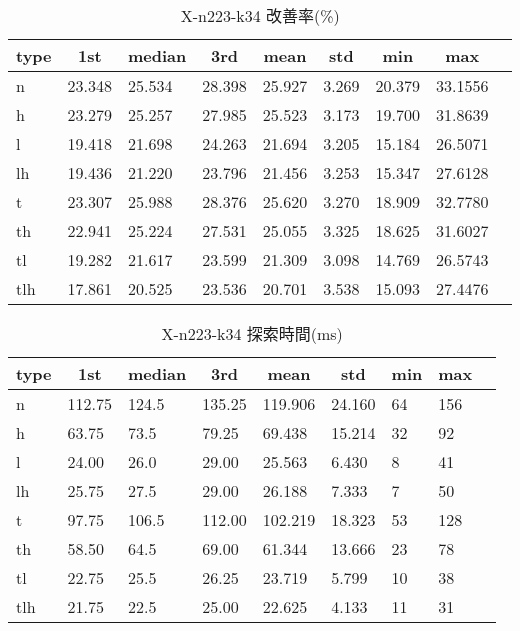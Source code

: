 \begin{table}[htbp]
    \caption{X-n223-k34 改善率(\%)}
    \begin{tabular}{|l|l|l|l|l|l|l|l|l|}\hline
    \multicolumn{1}{|c|}{\textbf{type}}
    &\multicolumn{1}{|c|}{\textbf{1st}}
    &\multicolumn{1}{c|}{\textbf{median}}
    &\multicolumn{1}{c|}{\textbf{3rd}}
    &\multicolumn{1}{c|}{\textbf{mean}}
    &\multicolumn{1}{c|}{\textbf{std}}
    &\multicolumn{1}{c|}{\textbf{min}}
    &\multicolumn{1}{c|}{\textbf{max}}\\\hline
	n & 23.348 & 25.534 & 28.398 & 25.927 & 3.269 & 20.379 & 33.1556\\\hline
	h & 23.279 & 25.257 & 27.985 & 25.523 & 3.173 & 19.700 & 31.8639\\\hline
	l & 19.418 & 21.698 & 24.263 & 21.694 & 3.205 & 15.184 & 26.5071\\\hline
	lh & 19.436 & 21.220 & 23.796 & 21.456 & 3.253 & 15.347 & 27.6128\\\hline
	t & 23.307 & 25.988 & 28.376 & 25.620 & 3.270 & 18.909 & 32.7780\\\hline
	th & 22.941 & 25.224 & 27.531 & 25.055 & 3.325 & 18.625 & 31.6027\\\hline
	tl & 19.282 & 21.617 & 23.599 & 21.309 & 3.098 & 14.769 & 26.5743\\\hline
	tlh & 17.861 & 20.525 & 23.536 & 20.701 & 3.538 & 15.093 & 27.4476\\\hline
	\end{tabular}
\end{table}
\begin{table}[htbp]
    \caption{X-n223-k34 探索時間(ms)}
    \begin{tabular}{|l|l|l|l|l|l|l|l|l|}\hline
    \multicolumn{1}{|c|}{\textbf{type}}
    &\multicolumn{1}{|c|}{\textbf{1st}}
    &\multicolumn{1}{c|}{\textbf{median}}
    &\multicolumn{1}{c|}{\textbf{3rd}}
    &\multicolumn{1}{c|}{\textbf{mean}}
    &\multicolumn{1}{c|}{\textbf{std}}
    &\multicolumn{1}{c|}{\textbf{min}}
    &\multicolumn{1}{c|}{\textbf{max}}\\\hline
	n & 112.75 & 124.5 & 135.25 & 119.906 & 24.160 & 64 & 156\\\hline
	h & 63.75 & 73.5 & 79.25 & 69.438 & 15.214 & 32 & 92\\\hline
	l & 24.00 & 26.0 & 29.00 & 25.563 & 6.430 & 8 & 41\\\hline
	lh & 25.75 & 27.5 & 29.00 & 26.188 & 7.333 & 7 & 50\\\hline
	t & 97.75 & 106.5 & 112.00 & 102.219 & 18.323 & 53 & 128\\\hline
	th & 58.50 & 64.5 & 69.00 & 61.344 & 13.666 & 23 & 78\\\hline
	tl & 22.75 & 25.5 & 26.25 & 23.719 & 5.799 & 10 & 38\\\hline
	tlh & 21.75 & 22.5 & 25.00 & 22.625 & 4.133 & 11 & 31\\\hline
	\end{tabular}
\end{table}
